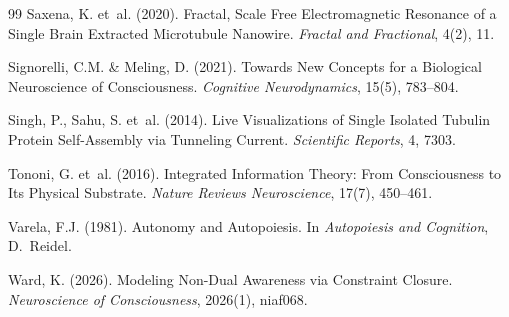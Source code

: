 \documentclass[12pt,a4paper]{article}
\begin{document}
\begin{thebibliography}{99}
Saxena, K. et~al. (2020).
\newblock Fractal, Scale Free Electromagnetic Resonance of a Single Brain Extracted Microtubule Nanowire.
\newblock \textit{Fractal and Fractional}, 4(2), 11.

Signorelli, C.M. \& Meling, D. (2021).
\newblock Towards New Concepts for a Biological Neuroscience of Consciousness.
\newblock \textit{Cognitive Neurodynamics}, 15(5), 783--804.

Singh, P., Sahu, S. et~al. (2014).
\newblock Live Visualizations of Single Isolated Tubulin Protein Self-Assembly via Tunneling Current.
\newblock \textit{Scientific Reports}, 4, 7303.

Tononi, G. et~al. (2016).
\newblock Integrated Information Theory: From Consciousness to Its Physical Substrate.
\newblock \textit{Nature Reviews Neuroscience}, 17(7), 450--461.

Varela, F.J. (1981).
\newblock Autonomy and Autopoiesis.
\newblock In \textit{Autopoiesis and Cognition}, D.~Reidel.

Ward, K. (2026).
\newblock Modeling Non-Dual Awareness via Constraint Closure.
\newblock \textit{Neuroscience of Consciousness}, 2026(1), niaf068.

\end{thebibliography}
\end{document}
